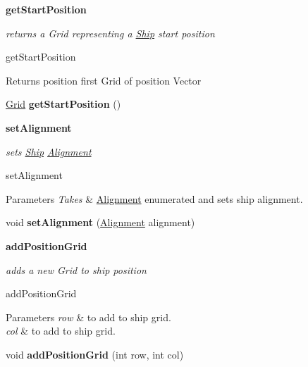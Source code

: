 \begin{Indent}{\bf get\+Start\+Position}\par
{\em returns a Grid representing a \hyperlink{classbattleship_1_1ships_1_1Ship}{Ship} start position

get\+Start\+Position

\begin{DoxyReturn}{Returns}
position first Grid of position Vector 
\end{DoxyReturn}
}\begin{DoxyCompactItemize}
\item 
\hypertarget{classbattleship_1_1ships_1_1Ship_a5bc07e369f4580f23e4cfb5ab7ef3efe}{}\hyperlink{classbattleship_1_1gameboard_1_1Grid}{Grid} {\bfseries get\+Start\+Position} ()\label{classbattleship_1_1ships_1_1Ship_a5bc07e369f4580f23e4cfb5ab7ef3efe}

\end{DoxyCompactItemize}
\end{Indent}
\begin{Indent}{\bf set\+Alignment}\par
{\em sets \hyperlink{classbattleship_1_1ships_1_1Ship}{Ship} \hyperlink{enumbattleship_1_1ships_1_1Alignment}{Alignment}

set\+Alignment


\begin{DoxyParams}{Parameters}
{\em Takes} & \hyperlink{enumbattleship_1_1ships_1_1Alignment}{Alignment} enumerated and sets ship alignment. \\
\hline
\end{DoxyParams}
}\begin{DoxyCompactItemize}
\item 
\hypertarget{classbattleship_1_1ships_1_1Ship_a4bded22db5bf5e8641cab2ffb5471d9e}{}void {\bfseries set\+Alignment} (\hyperlink{enumbattleship_1_1ships_1_1Alignment}{Alignment} alignment)\label{classbattleship_1_1ships_1_1Ship_a4bded22db5bf5e8641cab2ffb5471d9e}

\end{DoxyCompactItemize}
\end{Indent}
\begin{Indent}{\bf add\+Position\+Grid}\par
{\em adds a new Grid to ship position

add\+Position\+Grid


\begin{DoxyParams}{Parameters}
{\em row} & to add to ship grid. \\
\hline
{\em col} & to add to ship grid. \\
\hline
\end{DoxyParams}
}\begin{DoxyCompactItemize}
\item 
\hypertarget{classbattleship_1_1ships_1_1Ship_a3c24134ea86f9e7b5fc2f26da4c38504}{}void {\bfseries add\+Position\+Grid} (int row, int col)\label{classbattleship_1_1ships_1_1Ship_a3c24134ea86f9e7b5fc2f26da4c38504}

\end{DoxyCompactItemize}
\end{Indent}
